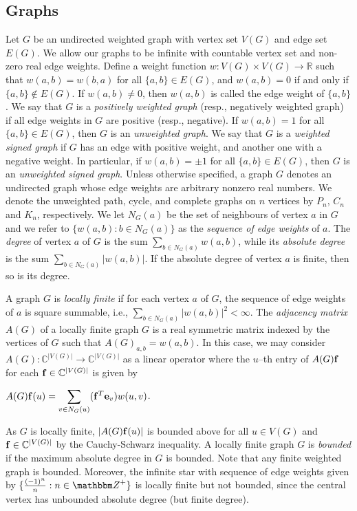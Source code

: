 \documentclass[12pt,a4paper]{article}
\def \Zl {{\mathbbm Z}}
\def \e {{\bf e}}
\def \f {{\bf f}}
\def \e {{\mathbf e}}
\begin{document}
\subsection{Graphs}

Let $G$ be an undirected weighted graph with vertex set $V(G)$ and edge set $E(G)$. We allow our graphs to be infinite with countable vertex set and non-zero real edge weights. Define a weight function $w: V(G)\times V(G)\to \mathbb{R}$ such that $w(a,b)=w(b,a)$ for all $\{a,b\}\in E(G)$, and $w(a,b)=0$ if and only if $\{a,b\}\notin E(G)$. If $w(a,b)\neq 0$, then $w(a,b)$ is called the edge weight of $\{a,b\}$. We say that $G$ is a \textit{positively weighted graph} (resp., negatively weighted graph) if all edge weights in $G$ are positive (resp., negative). If $w(a,b)=1$ for all $\{a,b\}\in E(G)$, then $G$ is an \textit{unweighted graph}. We say that $G$ is a \textit{weighted signed graph} if $G$ has an edge with positive weight, and another one with a negative weight. In particular, if $w(a,b)=\pm 1$ for all $\{a,b\}\in E(G)$, then $G$ is an \textit{unweighted signed graph}. Unless otherwise specified, a graph $G$ denotes an undirected graph whose edge weights are arbitrary nonzero real numbers. We denote the unweighted path, cycle, and complete graphs on $n$ vertices by $P_n$, $C_n$ and $K_n$, respectively. We let $N_G(a)$ be the set of neighbours of vertex $a$ in $G$ and we refer to $\{w(a,b):b\in N_G(a)\}$ as the \textit{sequence of edge weights} of $a$. The \textit{degree} of vertex $a$ of $G$ is the sum $\sum_{b \in N_G(a)} w(a,b)$, while its \textit{absolute degree} is the sum $\sum_{b \in N_G(a)} |w(a,b)|$. If the absolute degree of vertex $a$ is finite, then so is its degree. 

A graph $G$ is \textit{locally finite} if for each vertex $a$ of $G$, the sequence of edge weights of $a$ is square summable, i.e., $\sum_{b \in N_G(a)} |w(a,b)|^2<\infty$. The \textit{adjacency matrix} $A(G)$ of a locally finite graph $G$ is a real symmetric matrix indexed by the vertices of $G$ such that $A(G)_{a,b}=w(a,b).$ In this case, we may consider $A(G):\mathbb{C}^{|V(G)|}\rightarrow \mathbb{C}^{|V(G)|}$ as a linear operator where the $u$--th entry of $A(G)\f$ for each $\f\in \mathbb{C}^{|V(G)|}$ is given by
\begin{center}
$A(G)\f(u)=\displaystyle\sum_{v\in N_G(u)}(\f^T\e_v)w(u,v)$.
\end{center}
As $G$ is locally finite, $|A(G)\f(u)|$ is bounded above for all $u\in V(G)$ and $\f\in \mathbb{C}^{|V(G)|}$ by the Cauchy-Schwarz inequality.
A locally finite graph $G$ is \textit{bounded} if the maximum absolute degree  in $G$ is bounded. Note that any finite weighted graph is bounded. Moreover, the infinite star with sequence of edge weights given by $\{\frac{(-1)^n}{n}:n\in\Zl^+\}$ is locally finite but not bounded, since the central vertex has unbounded absolute degree (but finite degree).
\end{document}
